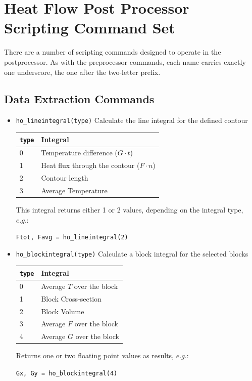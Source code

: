 \section{Heat Flow Post Processor Scripting Command Set}

There are a number of scripting commands designed to operate in
the postprocessor. As with the preprocessor commands, each name
carries exactly one underscore, the one after the two-letter prefix.

\subsection{Data Extraction Commands}
\begin{itemize}

\item \texttt{ho\_lineintegral(type)} Calculate the line integral for the defined contour

\begin{tabular}{ll}
\texttt{type} & Integral \\ \hline
 0 & Temperature difference ($G \cdot t$) \\
 1 & Heat flux through the contour ($F \cdot n$) \\
 2 & Contour length \\
 3 & Average Temperature \\
\end{tabular}

This integral returns either 1 or 2 values, depending on the
integral type, $e.g.:$

\texttt{Ftot, Favg = ho\_lineintegral(2)}

\item \texttt{ho\_blockintegral(type)} Calculate a block integral for the selected
blocks

\begin{tabular}{ll}
\texttt{type} & Integral \\ \hline
 0 & Average $T$ over the block \\
 1 & Block Cross-section \\
 2 & Block Volume \\
 3 & Average $F$ over the block \\
 4 & Average $G$ over the block \\
\end{tabular}

Returns one or two floating point values as results, $e.g$.:

\texttt{Gx, Gy = ho\_blockintegral(4)}


\end{itemize}
